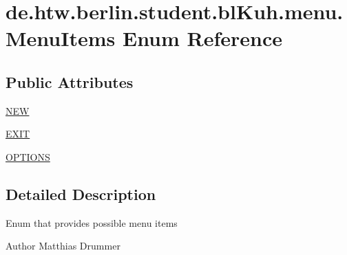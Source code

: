 \hypertarget{enumde_1_1htw_1_1berlin_1_1student_1_1bl_kuh_1_1menu_1_1_menu_items}{\section{de.\-htw.\-berlin.\-student.\-bl\-Kuh.\-menu.\-Menu\-Items Enum Reference}
\label{enumde_1_1htw_1_1berlin_1_1student_1_1bl_kuh_1_1menu_1_1_menu_items}
}
\subsection*{Public Attributes}
\begin{DoxyCompactItemize}
\item 
\hyperlink{enumde_1_1htw_1_1berlin_1_1student_1_1bl_kuh_1_1menu_1_1_menu_items_a7b9c04ebd62b141b4c79c6520c4f1dc7}{N\-E\-W}
\item 
\hyperlink{enumde_1_1htw_1_1berlin_1_1student_1_1bl_kuh_1_1menu_1_1_menu_items_a91c5db842ee9aa831b0896a575e9909f}{E\-X\-I\-T}
\item 
\hyperlink{enumde_1_1htw_1_1berlin_1_1student_1_1bl_kuh_1_1menu_1_1_menu_items_aadca86423f12d3f0f457ff4d0aba01e2}{O\-P\-T\-I\-O\-N\-S}
\end{DoxyCompactItemize}


\subsection{Detailed Description}
Enum that provides possible menu items

\begin{DoxyAuthor}{Author}
Matthias Drummer 
\end{DoxyAuthor}


